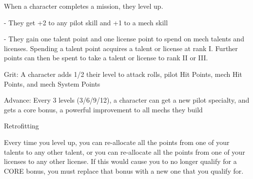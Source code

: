 When a character completes a mission, they level up. 
 
             -   They get +2 to any pilot skill and +1 to a mech skill
 
             -   They gain one talent point and one license point to spend on mech talents and  
                 licenses. Spending a talent point acquires a talent or license at rank I. Further  
                 points can then be spent to take a talent or license to rank II or III.
 

                                                                                                                


Grit: A character adds 1/2 their level to attack rolls, pilot Hit Points, mech Hit Points, and mech  
System Points
 
Advance: Every 3 levels (3/6/9/12), a character can get a new pilot specialty, and gets a core  
bonus, a powerful improvement to all mechs they build
 

                                              Retrofitting  

Every time you level up, you can re-allocate all the points from one of your talents to any other  
talent, or you can re-allocate all the points from one of your licenses to any other license. If this  
would cause you to no longer qualify for a CORE bonus, you must replace that bonus with a new  
one that you qualify for.
 